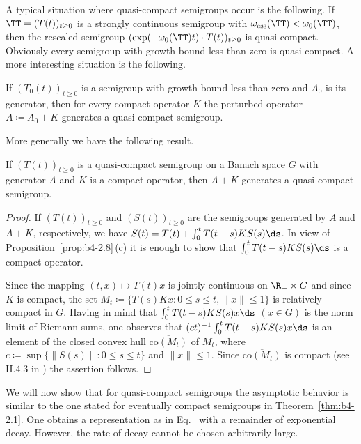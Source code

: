 A typical situation where quasi-compact semigroups occur is the following. 
If\/ $\TT = (T(t))_{t \geq 0}$ is a strongly continuous semigroup with $\omega_{\text{ess}}(\TT) < \omega_{0}(\TT)$, then the rescaled semigroup $(\text{exp}(-\omega_{0}(\TT)t)\cdot T(t))_{t \geq 0}$ is quasi-compact. 
Obviously every semigroup with growth bound less than zero is quasi-compact. 
A more interesting situation is the following.

If\/ $(T_{0}(t))_{t \geq 0}$ is a semigroup with growth bound less than zero and $A_{0}$ is its generator, then for every compact operator $K$ the perturbed operator $A \coloneqq A_{0} + K$ generates a quasi-compact semigroup.
	
More generally we have the following result.
\begin{proposition}\label{prop:b4-2.9}
    If\/ $(T(t))_{t \geq 0}$ is a quasi-compact semigroup on a Banach space $G$ with generator $A$ and $K$ is a compact operator, then $A + K$ generates a quasi-compact semigroup.
\end{proposition}
\begin{proof}
	If\/ $(T(t))_{t \geq 0}$ and $(S(t))_{t \geq 0}$ are the semigroups generated by $A$ and $A + K$, respectively, we have $S(t) = T(t) + \int_0^t T(t-s)KS(s)  \ds $.
	In view of Proposition~\ref{prop:b4-2.8}\,(c) it is enough to show that $\int_0^t T(t-s)KS(s)  \ds $ is a compact operator.
	
	Since the mapping $(t,x) \mapsto T(t)x$ is jointly continuous on $\R_+ \times G$ and since $K$ is compact, the set $M_t \coloneq \{T(s)Kx \colon 0 \leq s \leq t, \|x\| \leq 1\}$ is relatively compact in $G$. Having in mind that $\int_0^t T(t-s)KS(s)x  \ds $ $(x \in G)$ is the norm limit of Riemann sums, one observes that 
	$(ct)^{-1}\int_0^t T(t-s)KS(s)x  \ds $ is an element of the closed convex hull
	 $\overline{\mathrm{co}(M_t)}$ of\/ $M_t$, where $c \coloneq \sup \{\|S(s)\| \colon 0 \leq s \leq t\}$ and $\|x\| \leq 1$. Since $\overline{\mathrm{co}(M_t)}$ is compact (see II.4.3 in \textcite{schaefer:1966}) the assertion follows.
\end{proof}
We will now show that for quasi-compact semigroups the asymptotic behavior is similar to the one stated for eventually compact semigroups in Theorem~\ref{thm:b4-2.1}. 
One obtains a representation as in Eq.~ with a remainder of exponential decay. 
However, the rate of decay cannot be chosen arbitrarily large.
